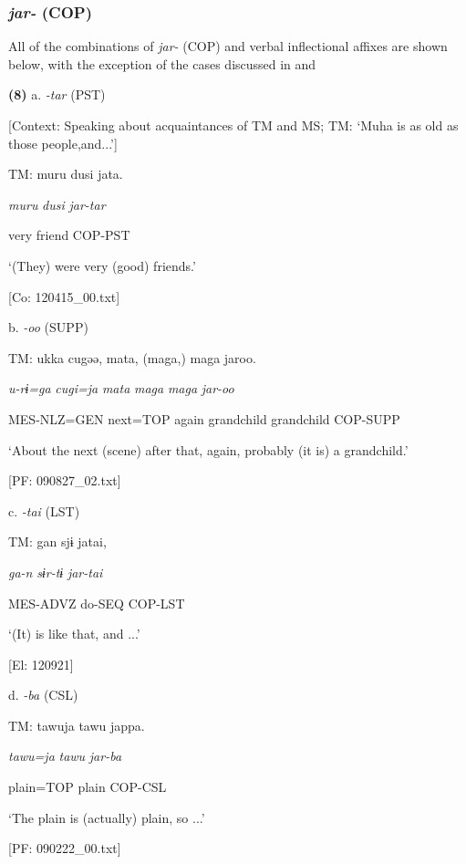 \subsubsection{\textit{jar-} (COP)}

All of the combinations of \textit{jar-} (COP) and verbal inflectional affixes are shown below, with the exception of the cases discussed in  and 

\textbf{(8)}  a.  \textit{{}-tar} (PST)

    [Context: Speaking about acquaintances of TM and MS; TM: ‘Muha is as old as those people,and...’]

    TM:  muru  dusi  jata.

      \textit{muru}  \textit{dusi}  \textit{jar-tar}

      very  friend  COP-PST

      ‘(They) were very (good) friends.’

      [Co: 120415\_00.txt]

  b.  \textit{{}-oo} (SUPP)

    TM:  ukka  cugəə,  mata,  (maga,)  maga  jaroo.

      \textit{u-rɨ=ga}  \textit{cugi=ja}  \textit{mata}  \textit{maga}  \textit{maga}  \textit{jar-oo}

      MES-NLZ=GEN  next=TOP  again  grandchild  grandchild  COP-SUPP

      ‘About the next (scene) after that, again, probably (it is) a grandchild.’

      [PF: 090827\_02.txt]

  c.  \textit{{}-tai} (LST)

    TM:  gan  sjɨ  jatai,

      \textit{ga-n}  \textit{sɨr-tɨ}  \textit{jar-tai}

      MES-ADVZ  do-SEQ  COP-LST

      ‘(It) is like that, and ...’

      [El: 120921]

  d.  \textit{{}-ba} (CSL)

    TM:  tawuja  tawu  jappa.

      \textit{tawu=ja}  \textit{tawu}  \textit{jar-ba}

      plain=TOP  plain  COP-CSL

      ‘The plain is (actually) plain, so ...’

      [PF: 090222\_00.txt]

